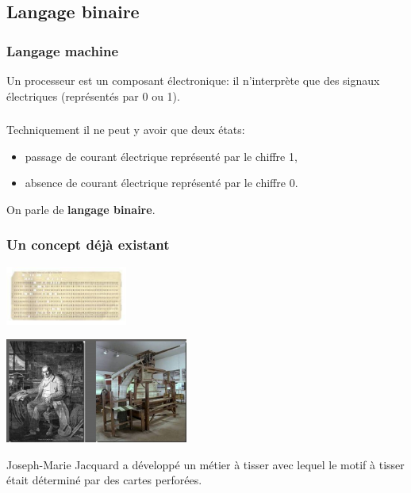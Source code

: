 \documentclass[svgnames,11pt]{beamer}
\begin{document}
\subsection{Langage binaire}
\begin{frame}
    \frametitle{Langage machine}

    \begin{aretenir}[]
        Un processeur est un composant électronique: il n'interprète que des signaux électriques (représentés par 0 ou 1).
    \end{aretenir}

\end{frame}
\begin{frame}
    \frametitle{}

    Techniquement il ne peut y avoir que deux états:
    \begin{itemize}
        \item passage de courant électrique représenté par le chiffre 1,
        \item absence de courant électrique représenté par le chiffre 0.
    \end{itemize}
    \begin{center}
        On parle de \textbf{langage binaire}.
    \end{center}
\end{frame}
\begin{frame}
    \frametitle{Un concept déjà existant}
    \begin{center}
        \includegraphics[width=4cm]{ressources/carte.jpg}

    \end{center}
    \begin{center}
        \centering
        \includegraphics[width=6cm]{ressources/jacquard.png}
    \end{center}
    \begin{aretenir}[1801]
        Joseph-Marie Jacquard a développé un métier à tisser avec lequel le motif à tisser était déterminé par des cartes perforées.
    \end{aretenir}
\end{frame}
\end{document}
